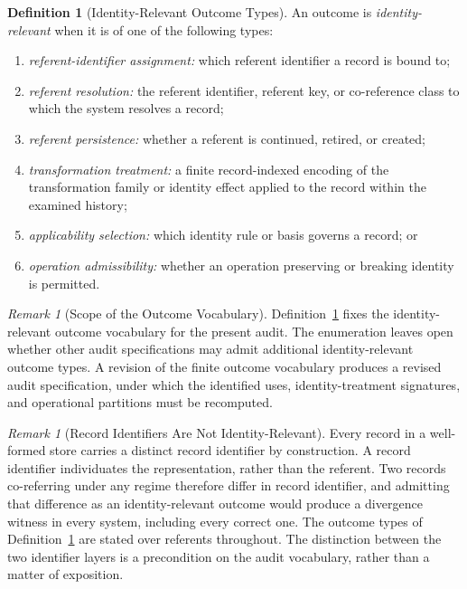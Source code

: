 \documentclass[11pt]{article}
\theoremstyle{plain}
\theoremstyle{definition}
\newtheorem{definition}[theorem]{Definition}
\theoremstyle{remark}
\newtheorem{remark}[theorem]{Remark}
\begin{document}
\begin{definition}[Identity-Relevant Outcome Types]
  \label{oi.def.outcomes}
  An outcome is \emph{identity-relevant}
  when it is of one of the following types:
  \begin{enumerate}[label=(\alph*)]
    \item \emph{referent-identifier assignment:}
          which referent identifier a record is bound to;
    \item \emph{referent resolution:}
          the referent identifier,
          referent key,
          or co-reference class
          to which the system resolves a record;
    \item \emph{referent persistence:}
          whether a referent is continued, retired, or created;
    \item \emph{transformation treatment:}
          a finite record-indexed encoding
          of the transformation family
          or identity effect applied to the record
          within the examined history;
    \item \emph{applicability selection:}
          which identity rule or basis governs a record; or
    \item \emph{operation admissibility:}
          whether an operation preserving or breaking identity is permitted.
  \end{enumerate}
\end{definition}

\begin{remark}[Scope of the Outcome Vocabulary]
  \label{oi.rem.outcome-vocabulary}
  Definition~\ref{oi.def.outcomes}
  fixes the identity-relevant outcome vocabulary for the present audit.
  The enumeration leaves open whether other audit specifications
  may admit additional identity-relevant outcome types.
  A revision of the finite outcome vocabulary produces a revised audit specification,
  under which the identified uses, identity-treatment signatures,
  and operational partitions must be recomputed.
\end{remark}

\begin{remark}[Record Identifiers Are Not Identity-Relevant]
  \label{oi.rem.recordid}
  Every record in a well-formed store carries a distinct record identifier by construction.
  A record identifier individuates the representation, rather than the referent.
  Two records co-referring under any regime therefore differ in record identifier,
  and admitting that difference as an identity-relevant outcome
  would produce a divergence witness in every system, including every correct one.
  The outcome types of Definition~\ref{oi.def.outcomes}
  are stated over referents throughout.
  The distinction between the two identifier layers
  is a precondition on the audit vocabulary, rather than a matter of exposition.
\end{remark}
\end{document}
